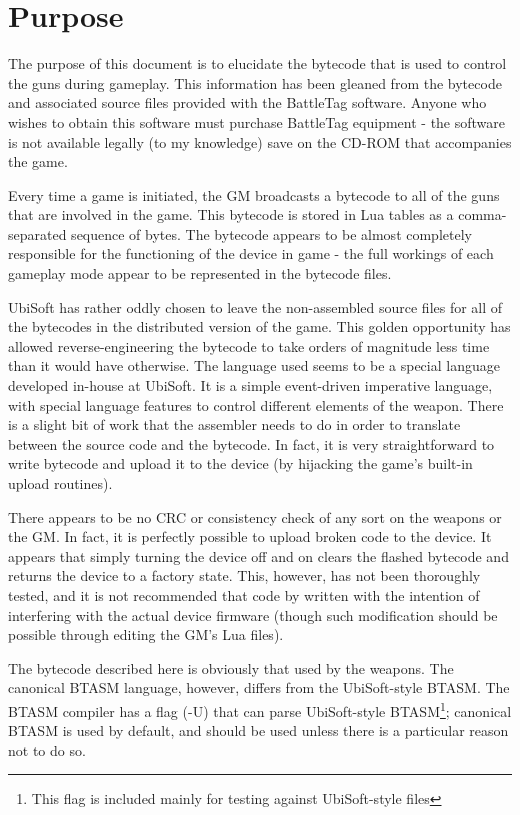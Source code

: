 \documentclass[12pt]{scrbook}
\begin{document}
\section*{Purpose}

The purpose of this document is to elucidate the bytecode that is used to control the 
guns during gameplay.  This information has been gleaned from the bytecode and associated
source files provided with the BattleTag software.  Anyone who wishes to obtain this 
software must purchase BattleTag equipment - the software is not available legally (to
my knowledge) save on the CD-ROM that accompanies the game.

Every time a game is initiated, the GM broadcasts a bytecode
to all of the guns that are involved in the game.  This bytecode is stored in Lua tables
as a comma-separated sequence of bytes.  The bytecode appears to be almost completely
responsible for the functioning of the device in game - the full workings of each gameplay
mode appear to be represented in the bytecode files.

UbiSoft has rather oddly chosen to leave the non-assembled source files for all of the
bytecodes in the distributed version of the game.  This golden opportunity has allowed
reverse-engineering the bytecode to take orders of magnitude less time than it would
have otherwise.  The language used seems to be a special language developed in-house at
UbiSoft.  It is a simple event-driven imperative language, with special language features to control
different elements of the weapon.  There is a slight bit of work that the assembler needs 
to do in order to translate between the source code and the bytecode.  In fact, it is very
straightforward to write bytecode and upload it to the device (by hijacking the game's built-in
upload routines).  

There appears to be no CRC or consistency check of any sort on the weapons or the GM.  In fact,
it is perfectly possible to upload broken code to the device.  It appears that simply turning
the device off and on clears the flashed bytecode and returns the device to a factory state.
This, however, has not been thoroughly tested, and it is not recommended that code by written
with the intention of interfering with the actual device firmware (though such modification 
should be possible through editing the GM's Lua files).

The bytecode described here is obviously that used by the weapons.  The canonical BTASM
 language,
however, differs from the UbiSoft-style BTASM.  The BTASM compiler has a flag
(-U) that can parse UbiSoft-style BTASM\footnote{This flag is included mainly for 
testing against UbiSoft-style files}; canonical BTASM is used by default, and should 
be used unless there is a particular reason not to do so.   
\end{document}
